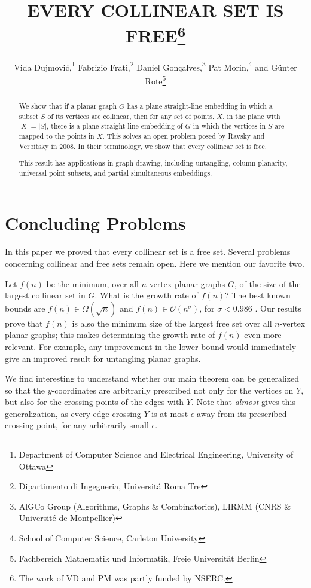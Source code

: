 \documentclass{patmorin}
\title{\MakeUppercase{Every Collinear Set Is Free}\thanks{%
    The work of VD and PM was partly funded by NSERC.}}
\author{Vida Dujmovi\'c,\thanks{Department of Computer Science and Electrical Engineering, University of Ottawa}\quad
        Fabrizio Frati,\thanks{Dipartimento di Ingegneria, Universit\'a Roma Tre}\quad 
        Daniel Gon\c{c}alves,\thanks{AlGCo Group (Algorithms, Graphs \& Combinatorics), LIRMM (CNRS \& Universit\'{e} de Montpellier)}\quad
        Pat Morin,\thanks{School of Computer Science, Carleton University}\quad 
        and G\"unter Rote\thanks{Fachbereich Mathematik und Informatik, Freie Universit\"at Berlin}}
\begin{document}
\maketitle


\begin{abstract}
  We show that if a planar graph $G$ has a plane straight-line embedding
   in which a subset $S$ of its vertices are collinear, then for any
   set of points, $X$, in the plane with $|X|=|S|$, there is a plane
  straight-line embedding of $G$ in which the vertices in $S$ are
  mapped to the points in $X$.  This solves an open problem posed by
  Ravsky and Verbitsky in 2008.  In their terminology, we show that
  every collinear set is free.
  
  This result has applications in graph drawing, including untangling,
  column planarity, universal point subsets, and partial simultaneous
  embeddings.
\end{abstract}






\section{Concluding Problems}

In this paper we proved that every collinear set is a free set. Several problems concerning collinear and free sets remain open. Here we mention our favorite two.

Let $f(n)$ be the minimum, over all $n$-vertex planar graphs $G$, of the size of the largest collinear set in $G$. What is the growth rate of $f(n)$? The best known bounds are $f(n)\in\Omega(\sqrt{n})$ and $f(n)\in \mathcal{O}(n^\sigma)$, for $\sigma < 0.986$ \cite{bose.dujmovic.ea:polynomial,ravsky.verbitsky:on}. Our results prove that $f(n)$ is also the minimum size of the largest free set over all $n$-vertex planar graphs; this makes determining the growth rate of $f(n)$ even more relevant. For example, any improvement in the lower bound would immediately give an improved result for untangling planar graphs.
%

We find interesting to understand whether our main theorem can be generalized so that the $y$-coordinates are arbitrarily prescribed not only for the vertices on $Y$, but also for the crossing points of the edges with $Y$. Note that  {\em almost} gives this generalization, as every edge crossing $Y$ is at most $\epsilon$ away from its prescribed crossing point, for any arbitrarily small $\epsilon$. 
\end{document}
